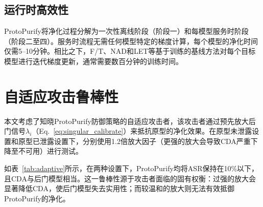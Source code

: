 \subsection{运行时高效性}

ProtoPurify将净化过程分解为一次性离线阶段（阶段一）和每模型服务时阶段（阶段二至四）。服务时流程无需任何模型特定的梯度计算，每个模型的净化时间仅需5--10分钟。相比之下，F/T、NAD和LET等基于训练的基线方法对每个目标模型进行迭代梯度更新，通常需要数百分钟的训练时间。

\section{自适应攻击鲁棒性}

本文考虑了知晓ProtoPurify防御策略的自适应攻击者，该攻击者通过预先放大后门信号$\lambda_i$（Eq.~\eqref{eq:singular_calibrate}）来抵抗原型的净化效果。在原型未泄露设置和原型已泄露设置下，分别使用1.2倍放大因子（更强的放大会导致CDA严重下降至不可用）进行测试。

如表~\ref{tab:adaptive}所示，在两种设置下，ProtoPurify均将ASR保持在10\%以下，且CDA与后门模型相当。这一鲁棒性源于攻击者面临的固有权衡：过强的放大会显著降低CDA，使后门模型失去实用性；而较温和的放大则无法有效抵御ProtoPurify的净化。

